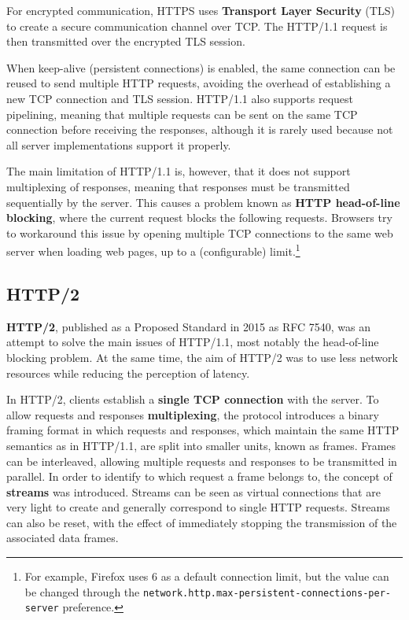 For encrypted communication, HTTPS uses \textbf{Transport Layer Security} (TLS) to create a secure communication channel over TCP. The HTTP/1.1 request is then transmitted over the encrypted TLS session.

When keep-alive (persistent connections) is enabled, the same connection can be reused to send multiple HTTP requests, avoiding the overhead of establishing a new TCP connection and TLS session. HTTP/1.1 also supports request pipelining, meaning that multiple requests can be sent on the same TCP connection before receiving the responses, although it is rarely used because not all server implementations support it properly.

The main limitation of HTTP/1.1 is, however, that it does not support multiplexing of responses, meaning that responses must be transmitted sequentially by the server. This causes a problem known as \textbf{HTTP head-of-line blocking}, where the current request blocks the following requests. Browsers try to workaround this issue by opening multiple TCP connections to the same web server when loading web pages, up to a (configurable) limit.\footnote{For example, Firefox uses 6 as a default connection limit, but the value can be changed through the \texttt{network.http.max-persistent-connections-per-server} preference.} 

\subsection{HTTP/2}
\label{sec:bg/http2}

\textbf{HTTP/2}, published as a Proposed Standard in 2015 as RFC 7540, was an attempt to solve the main issues of HTTP/1.1, most notably the head-of-line blocking problem. At the same time, the aim of HTTP/2 was to use less network resources while reducing the perception of latency.\cite{http2}

In HTTP/2, clients establish a \textbf{single TCP connection} with the server. To allow requests and responses \textbf{multiplexing}, the protocol introduces a binary framing format in which requests and responses, which maintain the same HTTP semantics as in HTTP/1.1, are split into smaller units, known as frames. Frames can be interleaved, allowing multiple requests and responses to be transmitted in parallel. In order to identify to which request a frame belongs to, the concept of \textbf{streams} was introduced. Streams can be seen as virtual connections that are very light to create and generally correspond to single HTTP requests. Streams can also be reset, with the effect of immediately stopping the transmission of the associated data frames.

